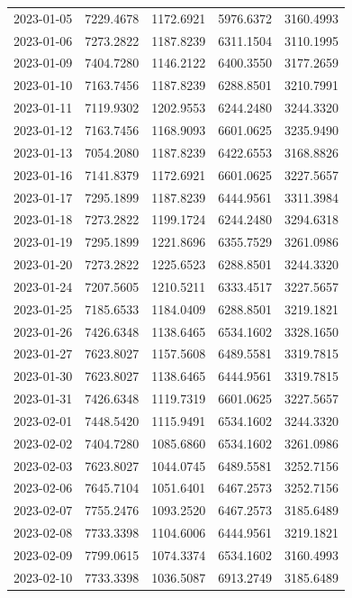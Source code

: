 \begin{footnotesize}
\begin{longtable}{lllll}
2023-01-05 & 7229.4678 & 1172.6921 & 5976.6372 & 3160.4993 \\
2023-01-06 & 7273.2822 & 1187.8239 & 6311.1504 & 3110.1995 \\
2023-01-09 & 7404.7280 & 1146.2122 & 6400.3550 & 3177.2659 \\
2023-01-10 & 7163.7456 & 1187.8239 & 6288.8501 & 3210.7991 \\
2023-01-11 & 7119.9302 & 1202.9553 & 6244.2480 & 3244.3320 \\
2023-01-12 & 7163.7456 & 1168.9093 & 6601.0625 & 3235.9490 \\
2023-01-13 & 7054.2080 & 1187.8239 & 6422.6553 & 3168.8826 \\
2023-01-16 & 7141.8379 & 1172.6921 & 6601.0625 & 3227.5657 \\
2023-01-17 & 7295.1899 & 1187.8239 & 6444.9561 & 3311.3984 \\
2023-01-18 & 7273.2822 & 1199.1724 & 6244.2480 & 3294.6318 \\
2023-01-19 & 7295.1899 & 1221.8696 & 6355.7529 & 3261.0986 \\
2023-01-20 & 7273.2822 & 1225.6523 & 6288.8501 & 3244.3320 \\
2023-01-24 & 7207.5605 & 1210.5211 & 6333.4517 & 3227.5657 \\
2023-01-25 & 7185.6533 & 1184.0409 & 6288.8501 & 3219.1821 \\
2023-01-26 & 7426.6348 & 1138.6465 & 6534.1602 & 3328.1650 \\
2023-01-27 & 7623.8027 & 1157.5608 & 6489.5581 & 3319.7815 \\
2023-01-30 & 7623.8027 & 1138.6465 & 6444.9561 & 3319.7815 \\
2023-01-31 & 7426.6348 & 1119.7319 & 6601.0625 & 3227.5657 \\
2023-02-01 & 7448.5420 & 1115.9491 & 6534.1602 & 3244.3320 \\
2023-02-02 & 7404.7280 & 1085.6860 & 6534.1602 & 3261.0986 \\
2023-02-03 & 7623.8027 & 1044.0745 & 6489.5581 & 3252.7156 \\
2023-02-06 & 7645.7104 & 1051.6401 & 6467.2573 & 3252.7156 \\
2023-02-07 & 7755.2476 & 1093.2520 & 6467.2573 & 3185.6489 \\
2023-02-08 & 7733.3398 & 1104.6006 & 6444.9561 & 3219.1821 \\
2023-02-09 & 7799.0615 & 1074.3374 & 6534.1602 & 3160.4993 \\
2023-02-10 & 7733.3398 & 1036.5087 & 6913.2749 & 3185.6489 \\

\end{longtable}
\end{footnotesize}
